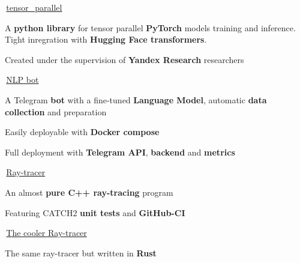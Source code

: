 
\begin{cventries}
  \cventry
    {} %
    {\,\faGithub\acvHeaderIconSep\href{https://github.com/BlackSamorez/tensor_parallel}{tensor\_parallel}} %
    {} %
    {} %
    {
      \begin{cvitems} %
        \item {A \textbf{python library} for tensor parallel \textbf{PyTorch} models training and inference. Tight inregration with \textbf{Hugging Face transformers}.}
        \item {Created under the supervision of \textbf{Yandex Research} researchers}
      \end{cvitems}
    }
    
  \cventry
    {} %
    {\,\faGithub\acvHeaderIconSep\href{https://github.com/BlackSamorez/ebanko}{NLP bot}} %
    {} %
    {} %
    {
      \begin{cvitems} %
        \item {A Telegram \textbf{bot} with a fine-tuned \textbf{Language Model}, automatic \textbf{data collection} and preparation}
        \item {Easily deployable with \textbf{Docker compose}}
		\item {Full deployment with \textbf{Telegram API}, \textbf{backend} and \textbf{metrics}}
      \end{cvitems}
    }
    
  \cventry
    {} %
    {\,\faGithub\acvHeaderIconSep\href{https://github.com/BlackSamorez/raytracer21}{Ray-tracer}} %
    {} %
    {} %
    {
      \begin{cvitems} %
        \item {An almost \textbf{pure C++ ray-tracing} program}
		\item {Featuring CATCH2 \textbf{unit tests} and \textbf{GitHub-CI}}
      \end{cvitems}
    }

  \cventry
    {} %
    {\,\faGithub\acvHeaderIconSep\href{https://github.com/BlackSamorez/raytracer22}{The cooler Ray-tracer}} %
    {} %
    {} %
    {
      \begin{cvitems} %
        \item {The same ray-tracer but written in \textbf{Rust}}
      \end{cvitems}
    }
    

\end{cventries}
